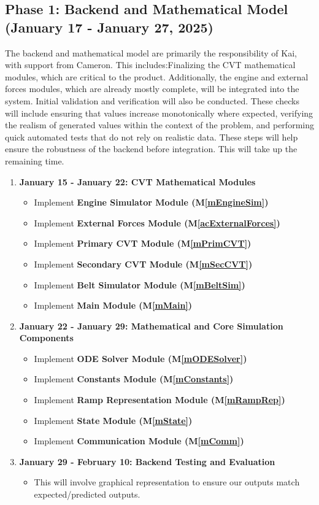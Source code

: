 \documentclass[12pt, titlepage]{article}
\begin{document}
\subsection*{Phase 1: Backend and Mathematical Model (January 17 - January 27, 2025)}
The backend and mathematical model are primarily the responsibility of Kai, with support from Cameron. 
This includes:Finalizing the CVT mathematical modules, which are critical to the product. Additionally, the engine and external forces modules, which are already mostly complete, will be integrated into the system.
Initial validation and verification will also be conducted. These checks will include ensuring that values increase monotonically where expected, verifying the realism of generated values within the context of the problem, and performing quick automated tests that do not rely on realistic data. 
These steps will help ensure the robustness of the backend before integration. This will take up the remaining time.
\begin{enumerate}
    \item \textbf{January 15 - January 22: CVT Mathematical Modules}
    \begin{itemize}
        \item Implement \textbf{Engine Simulator Module (M\ref{mEngineSim})}
        \item Implement \textbf{External Forces Module (M\ref{acExternalForces})}
        \item Implement \textbf{Primary CVT Module (M\ref{mPrimCVT})}
        \item Implement \textbf{Secondary CVT Module (M\ref{mSecCVT})}
        \item Implement \textbf{Belt Simulator Module (M\ref{mBeltSim})}
        \item Implement \textbf{Main Module (M\ref{mMain})}
    \end{itemize}
    
    \item \textbf{January 22 - January 29: Mathematical and Core Simulation Components}
    \begin{itemize}
        \item Implement \textbf{ODE Solver Module (M\ref{mODESolver})}
        \item Implement \textbf{Constants Module (M\ref{mConstants})}
        \item Implement \textbf{Ramp Representation Module (M\ref{mRampRep})}
        \item Implement \textbf{State Module (M\ref{mState})}
        \item Implement \textbf{Communication Module (M\ref{mComm})}
    \end{itemize}

    \item \textbf{January 29 - February 10: Backend Testing and Evaluation}
    \begin{itemize}
      \item This will involve graphical representation to ensure our outputs match expected/predicted outputs.
    \end{itemize}

\end{enumerate}
\end{document}
